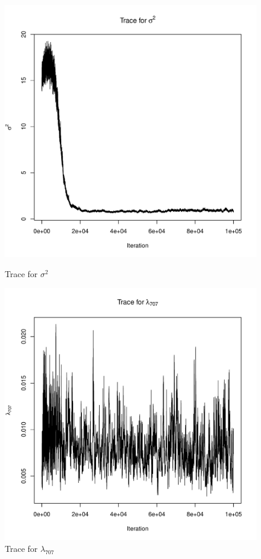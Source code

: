 \documentclass[10pt, compress]{beamer}
\begin{document}
\begin{frame}
\begin{figure}
\begin{minipage}{0.3\textwidth}
        \includegraphics[width=1.0\textwidth]{sigma_trace.pdf}
        \caption{Trace for $\sigma^2$}
      \end{minipage}
      \hfill
      \begin{minipage}{0.3\textwidth}
        \includegraphics[width=1.0\textwidth]{lambda_trace.pdf}
        \caption{Trace for $\lambda_{707}$}
      \end{minipage}
    \end{figure}
  \end{frame}
\end{document}
